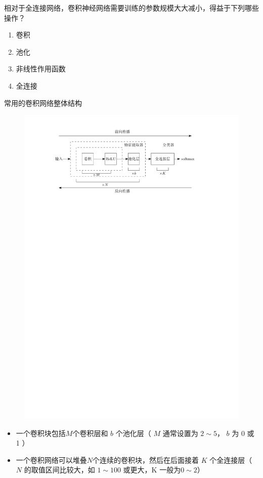 \begin{example}
    相对于全连接网络，卷积神经网络需要训练的参数规模大大减小，得益于下列哪些操作？
    \begin{enumerate}[A]
        \item \textcolor{main1}{卷积}
        \item \textcolor{main1}{池化}
        \item 非线性作用函数
        \item 全连接
    \end{enumerate}
\end{example}
\begin{note}
    常用的卷积网络整体结构
    \begin{figure}[htbp]
        \centering
        \includegraphics{image/CNN结构.pdf}
    \end{figure}
    \begin{itemize}
        \item 一个卷积块包括$M$个卷积层和 $b$ 个池化层（ $M$ 通常设置为      $2\sim 5$， $b$ 为 0 或 1 ）
        \item 一个卷积网络可以堆叠$N$个连续的卷积块，然后在后面接着 $K$ 个全连接层（ $N$ 的取值区间比较大，如 $1\sim 100$ 或更大，K 一般为$0\sim 2$）
    \end{itemize}
\end{note}
